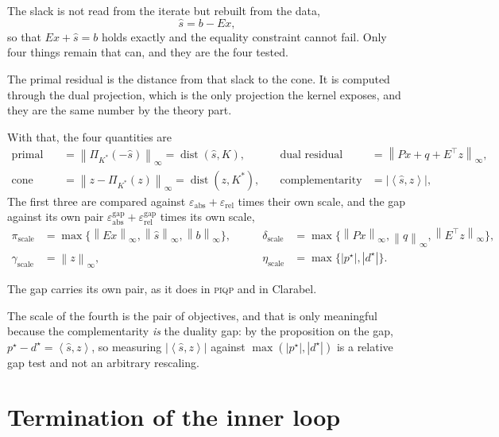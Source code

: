 \documentclass[a4paper,11pt]{book}
\theoremstyle{plain}
\theoremstyle{definition}
\theoremstyle{remark}
\numberwithin{equation}{chapter}
\numberwithin{algorithm}{chapter}
\newcommand{\proj}[2]{\Pi_{#2}\!\left(#1\right)}
\newcommand{\norm}[1]{\left\|#1\right\|}
\newcommand{\inner}[2]{\left\langle #1, #2 \right\rangle}
\DeclareMathOperator{\dist}{dist}
\begin{document}
	The slack is not read from the iterate but rebuilt from the data,
	\[
	\widehat s=b-Ex ,
	\]
	so that $Ex+\widehat s=b$ holds exactly and the equality constraint cannot
	fail. Only four things remain that can, and they are the four tested.

	The primal residual is the distance from that slack to the cone. It is
	computed through the dual projection, which is the only projection the kernel
	exposes, and they are the same number by the theory part.


	With that, the four quantities are
	\[
	\begin{aligned}
		\text{primal residual} &= \norm{\proj{-\widehat s}{K^*}}_\infty
		=\dist(\widehat s,K),
		&\quad
		\text{dual residual} &= \norm{Px+q+E^{\top}z}_\infty,\\[1mm]
		\text{cone violation} &= \norm{z-\proj{z}{K^*}}_\infty
		=\dist(z,K^*),
		&\quad
		\text{complementarity} &= \bigl|\inner{\widehat s}{z}\bigr| ,
	\end{aligned}
	\]
	The first three are compared against $\varepsilon_{\mathrm{abs}}
	+\varepsilon_{\mathrm{rel}}$ times their own scale, and the gap against its
	own pair $\varepsilon^{\mathrm{gap}}_{\mathrm{abs}}
	+\varepsilon^{\mathrm{gap}}_{\mathrm{rel}}$ times its own scale,
	\[
	\begin{aligned}
		\pi_{\mathrm{scale}}
		&=\max\bigl\{\norm{Ex}_\infty,\norm{\widehat s}_\infty,
		\norm{b}_\infty\bigr\},
		&\qquad
		\delta_{\mathrm{scale}}
		&=\max\bigl\{\norm{Px}_\infty,\norm{q}_\infty,
		\norm{E^{\top}z}_\infty\bigr\},\\[1mm]
		\gamma_{\mathrm{scale}}&=\norm{z}_\infty,
		&\qquad
		\eta_{\mathrm{scale}}&=\max\bigl\{|p^{\star}|,|d^{\star}|\bigr\} .
	\end{aligned}
	\]

	The gap carries its own pair, as it does in \textsc{piqp} and in Clarabel.

	The scale of the fourth is the pair of objectives, and that is only meaningful
	because the complementarity \emph{is} the duality gap: by the proposition on
	the gap, $p^{\star}-d^{\star}=\inner{\widehat s}{z}$, so measuring
	$|\inner{\widehat s}{z}|$ against $\max(|p^{\star}|,|d^{\star}|)$ is a
	relative gap test and not an arbitrary rescaling.

	\section{Termination of the inner loop}
\end{document}
